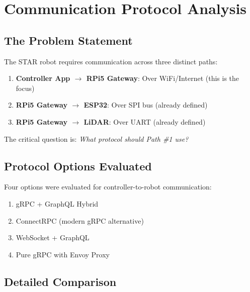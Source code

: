 \section{Communication Protocol Analysis}

\subsection{The Problem Statement}

The STAR robot requires communication across three distinct paths:

\begin{enumerate}
    \item \textbf{Controller App $\rightarrow$ RPi5 Gateway}: Over WiFi/Internet (this is the focus)
    \item \textbf{RPi5 Gateway $\rightarrow$ ESP32}: Over SPI bus (already defined)
    \item \textbf{RPi5 Gateway $\rightarrow$ LiDAR}: Over UART (already defined)
\end{enumerate}

The critical question is: \textit{What protocol should Path \#1 use?}

\subsection{Protocol Options Evaluated}

Four options were evaluated for controller-to-robot communication:

\begin{enumerate}
    \item gRPC + GraphQL Hybrid
    \item ConnectRPC (modern gRPC alternative)
    \item WebSocket + GraphQL
    \item Pure gRPC with Envoy Proxy
\end{enumerate}

\subsection{Detailed Comparison}

